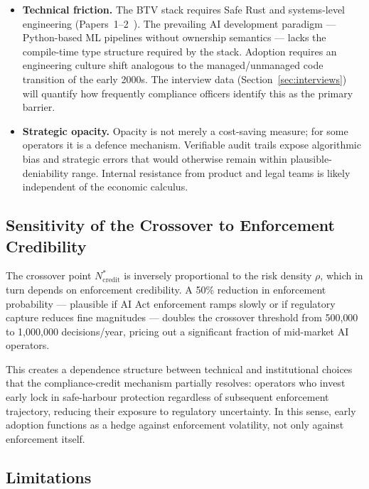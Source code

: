 \begin{itemize}
  \item \textbf{Technical friction.} The BTV stack requires Safe Rust
  and systems-level engineering (Papers~1--2~\cite{btv2026,btv-t-repo}).
  The prevailing AI development paradigm --- Python-based ML pipelines
  without ownership semantics --- lacks the compile-time type structure
  required by the stack. Adoption requires an engineering culture shift
  analogous to the managed/unmanaged code transition of the early 2000s.
  The interview data (Section~\ref{sec:interviews}) will quantify how
  frequently compliance officers identify this as the primary barrier.

  \item \textbf{Strategic opacity.} Opacity is not merely a cost-saving
  measure; for some operators it is a defence mechanism. Verifiable
  audit trails expose algorithmic bias and strategic errors that would
  otherwise remain within plausible-deniability range. Internal
  resistance from product and legal teams is likely independent of
  the economic calculus.
\end{itemize}

\subsection{Sensitivity of the Crossover to Enforcement Credibility}
\label{subsec:sensitivity}

The crossover point $N^*_{\text{credit}}$ is inversely proportional to
the risk density $\rho$, which in turn depends on enforcement
credibility. A 50\% reduction in enforcement probability --- plausible
if AI Act enforcement ramps slowly or if regulatory capture reduces
fine magnitudes --- doubles the crossover threshold from 500{,}000 to
1{,}000{,}000 decisions/year, pricing out a significant fraction of
mid-market AI operators.

This creates a dependence structure between technical and institutional
choices that the compliance-credit mechanism partially resolves:
operators who invest early lock in safe-harbour protection regardless
of subsequent enforcement trajectory, reducing their exposure to
regulatory uncertainty. In this sense, early adoption functions as
a hedge against enforcement volatility, not only against enforcement
itself.

\subsection{Limitations}
\label{subsec:limitations}

